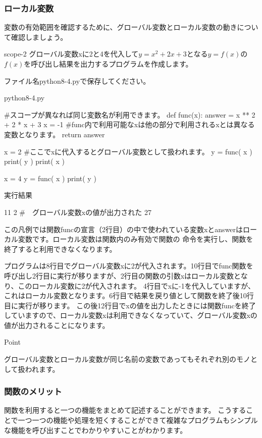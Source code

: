 \documentclass[11pt,a4paper,dvipdfmx,titlepage]{jsreport}
\begin{document}
\newpage
\subsubsection{ローカル変数}
変数の有効範囲を確認するために、グローバル変数とローカル変数の動きについて確認しましょう。


\begin{pabox}{scope-2}
グローバル変数xに2と4を代入して$y = x^2 + 2 x + 3$となる$y = f(x)$の$f(x)$を呼び出し結果を出力するプログラムを作成します。

ファイル名python8-4.pyで保存してください。
\begin{codebox}{python8-4.py}
\begin{listing}{1}
#スコープが異なれば同じ変数名が利用できます。
def func(x):
    answer = x ** 2 + 2 * x + 3
    x = -1
    #func内で利用可能なxは他の部分で利用されるxとは異なる変数となります。
    return answer

x = 2
#ここでxに代入するとグローバル変数として扱われます。
y = func( x )
print( y )
print( x ) 

x = 4
y = func( x )
print( y )
\end{listing}
実行結果
\begin{listing}{1}
11
2   #　グローバル変数xの値が出力された
27
\end{listing}
\end{codebox}
この凡例では関数funcの宣言（2行目）の中で使われている変数xとanswerはローカル変数です。ローカル変数は関数内のみ有効で関数の
命令を実行し、関数を終了すると利用できなくなります。

プログラムは8行目でグローバル変数xに2が代入されます。10行目でfunc関数を呼び出し2行目に実行が移りますが、2行目の関数の引数xはローカル変数となり、このローカル変数に2が代入されます。
4行目でxに-1を代入していますが、これはローカル変数となります。6行目で結果を戻り値として関数を終了後10行目に実行が移ります。
この後12行目でxの値を出力したときには関数funcを終了していますので、ローカル変数xは利用できなくなっていて、グローバル変数xの値が出力されることになります。

\end{pabox}
\begin{hipoint}{Point}

グローバル変数とローカル変数が同じ名前の変数であってもそれぞれ別のモノとして扱われます。

\end{hipoint}
\newpage
\subsubsection{関数のメリット}
関数を利用すると一つの機能をまとめて記述することができます。
こうすることで一つ一つの機能や処理を短くすることができて複雑なプログラムもシンプルな機能を呼び出すことでわかりやすいことがわかります。
\end{document}
